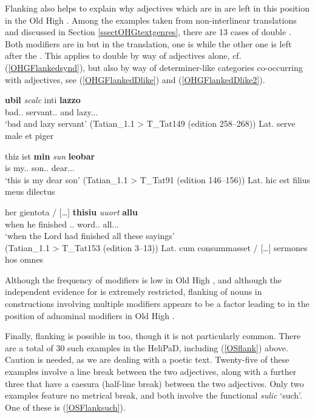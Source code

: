 \documentclass[output=paper,colorlinks,citecolor=brown,draft]{langscibook}
\begin{document}
Flanking also helps to explain why adjectives which are  in  are left in this position in the Old High . Among the examples taken from non-interlinear translations and discussed in Section \ref{ssectOHGtextgenres}, there are 13 cases of double . Both modifiers are  in  but in the translation, one is  while the other one is left after the . This applies to double  by way of adjectives alone, cf. (\ref{OHGFlankedsynd}), but also by way of determiner-like categories co-occurring with adjectives, see (\ref{OHGFlankedDlike}) and (\ref{OHGFlankedDlike2}).

\ea\label{OHGFlankedsynd}
\gll \textbf{ubil} \textit{scalc} inti \textbf{lazzo}\\
	bad.\NOM.\SG{} servant.\NOM.\SG{} and lazy.\NOM.\SG.\WK{}\\
\glt ‘bad and lazy servant’ (Tatian\_1.1 > T\_Tat149 (edition 258--268))
\glt Lat. serve male et piger
\z
							

\ea\label{OHGFlankedDlike}
\gll thiz ist \textbf{min} \textit{sun} \textbf{leobar}\\
\DEM{} is my.\NOM.\SG{} son.\NOM.\SG{} dear.\NOM.\SG.\STR{}\\
\glt ‘this is my dear son’ (Tatian\_1.1 > T\_Tat91 (edition 146--156))
\glt Lat. hic est filius meus dilectus
\z
							

\ea\label{OHGFlankedDlike2}
 her gientota / […] \textbf{thisiu} \textit{uuort} \textbf{allu}\\
	when he finished {} {} \DEM.\ACC.\PL{} word.\ACC.\PL{} all.\ACC.\PL.\STR{}\\
\glt ‘when the Lord had finished all these sayings’ \\
(Tatian\_1.1 > T\_Tat153 (edition 3--13))
\glt Lat. cum consummasset / […] sermones hos omnes
\z

Although the frequency of  modifiers is low in Old High , and although the independent evidence for   is extremely restricted, flanking of nouns in constructions involving multiple modifiers appears to be a factor leading to  in the position of adnominal modifiers in Old High . 

Finally, flanking is possible in  too, though it is not particularly common. There are a total of 30 such examples in the HeliPaD, including (\ref{OSflank}) above. Caution is needed, as we are dealing with a poetic text. Twenty-five of these examples involve a line break between the two adjectives, along with a further three that have a caesura (half-line break) between the two adjectives. Only two examples feature no metrical break, and both involve the functional  \textit{sulic} ‘such’. One of these is (\ref{OSFlanksuch}).
\end{document}

